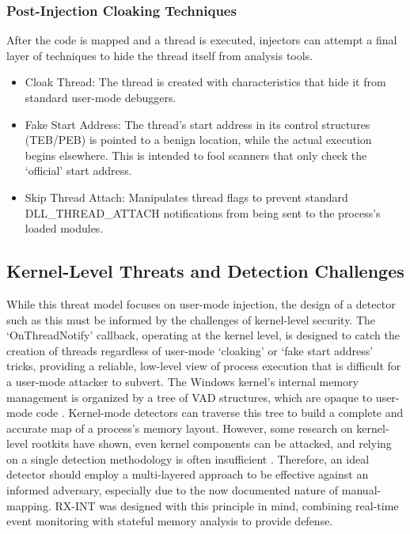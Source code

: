 \documentclass[journal]{IEEEtran}
\begin{document}
\subsubsection{Post-Injection Cloaking Techniques}
After the code is mapped and a thread is executed, injectors can attempt a final layer of techniques to hide the thread itself from analysis tools.
\begin{itemize}
\item Cloak Thread: The thread is created with characteristics that hide it from standard user-mode debuggers.
\item Fake Start Address: The thread's start address in its control structures (TEB/PEB) is pointed to a benign location, while the actual execution begins elsewhere. This is intended to fool scanners that only check the `official' start address.
\item Skip Thread Attach: Manipulates thread flags to prevent standard DLL\_THREAD\_ATTACH notifications from being sent to the process's loaded modules.
\end{itemize}
\subsection{Kernel-Level Threats and Detection Challenges}
While this threat model focuses on user-mode injection, the design of a detector such as this must be informed by the challenges of kernel-level security. The `OnThreadNotify' callback, operating at the kernel level, is designed to catch the creation of threads regardless of user-mode `cloaking' or `fake start address' tricks, providing a reliable, low-level view of process execution that is difficult for a user-mode attacker to subvert. The Windows kernel's internal memory management is organized by a tree of VAD structures, which are opaque to user-mode code \cite{Russinovich2022}. Kernel-mode detectors can traverse this tree to build a complete and accurate map of a process's memory layout. However, some research on kernel-level rootkits have shown, even kernel components can be attacked, and relying on a single detection methodology is often insufficient \cite{nadim2023kernellevelrootkitdetectionprevention}. Therefore, an ideal detector should employ a multi-layered approach to be effective against an informed adversary, especially due to the now documented nature of manual-mapping. RX-INT was designed with this principle in mind, combining real-time event monitoring with stateful memory analysis to provide defense. 
\end{document}
